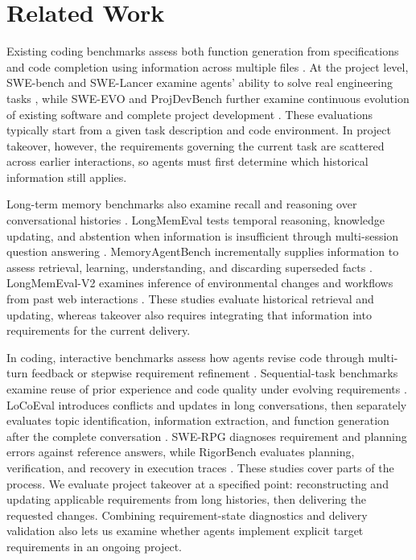 \documentclass{article} %
\begin{document}
\section{Related Work}
\label{sec:related-work}

Existing coding benchmarks assess both function generation from specifications \citep{chen2021codex,austin2021mbpp,zhuo2025bigcodebench} and code completion using information across multiple files \citep{ding2023crosscodeeval,liu2024repobench}. At the project level, SWE-bench and SWE-Lancer examine agents' ability to solve real engineering tasks \citep{jimenez2024swebench,miserendino2025swelancer}, while SWE-EVO and ProjDevBench further examine continuous evolution of existing software and complete project development \citep{le2026sweevo,lu2026projdevbench}. These evaluations typically start from a given task description and code environment. In project takeover, however, the requirements governing the current task are scattered across earlier interactions, so agents must first determine which historical information still applies.

Long-term memory benchmarks also examine recall and reasoning over conversational histories \citep{maharana2024locomo}. LongMemEval tests temporal reasoning, knowledge updating, and abstention when information is insufficient through multi-session question answering \citep{wu2025longmemeval}. MemoryAgentBench incrementally supplies information to assess retrieval, learning, understanding, and discarding superseded facts \citep{hu2025memoryagentbench}. LongMemEval-V2 examines inference of environmental changes and workflows from past web interactions \citep{wu2026longmemevalv2}. These studies evaluate historical retrieval and updating, whereas takeover also requires integrating that information into requirements for the current delivery.

In coding, interactive benchmarks assess how agents revise code through multi-turn feedback or stepwise requirement refinement \citep{han2025convcodeworld,miao2026recodeh,zhan2025sreval}. Sequential-task benchmarks examine reuse of prior experience and code quality under evolving requirements \citep{joshi2025swebenchcl,zhu2026swecontextbench,orlanski2026slopcode}. LoCoEval introduces conflicts and updates in long conversations, then separately evaluates topic identification, information extraction, and function generation after the complete conversation \citep{liu2026locoeval}. SWE-RPG diagnoses requirement and planning errors against reference answers, while RigorBench evaluates planning, verification, and recovery in execution traces \citep{zhou2026swerpg,madiraju2026rigorbench}. These studies cover parts of the process. We evaluate project takeover at a specified point: reconstructing and updating applicable requirements from long histories, then delivering the requested changes. Combining requirement-state diagnostics and delivery validation also lets us examine whether agents implement explicit target requirements in an ongoing project.
\end{document}
